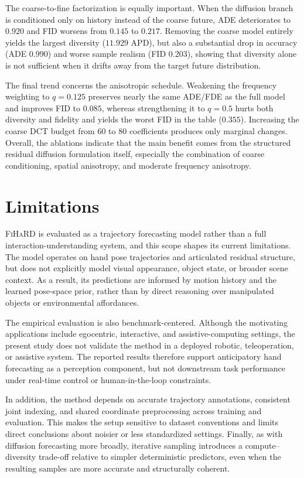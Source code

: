 \documentclass[runningheads]{llncs}
\newcommand{\modelname}{\textsc{FiHaRD}}
\begin{document}
The coarse-to-fine factorization is equally important. When the diffusion branch is conditioned only on history instead of the coarse future, ADE deteriorates to $0.920$ and FID worsens from $0.145$ to $0.217$. Removing the coarse model entirely yields the largest diversity ($11.929$ APD), but also a substantial drop in accuracy (ADE $0.990$) and worse sample realism (FID $0.203$), showing that diversity alone is not sufficient when it drifts away from the target future distribution.

The final trend concerns the anisotropic schedule. Weakening the frequency weighting to $q=0.125$ preserves nearly the same ADE/FDE as the full model and improves FID to $0.085$, whereas strengthening it to $q=0.5$ hurts both diversity and fidelity and yields the worst FID in the table ($0.355$). Increasing the coarse DCT budget from $60$ to $80$ coefficients produces only marginal changes. Overall, the ablations indicate that the main benefit comes from the structured residual diffusion formulation itself, especially the combination of coarse conditioning, spatial anisotropy, and moderate frequency anisotropy.

\section{Limitations}

\modelname{} is evaluated as a trajectory forecasting model rather than a full interaction-understanding system, and this scope shapes its current limitations. The model operates on hand pose trajectories and articulated residual structure, but does not explicitly model visual appearance, object state, or broader scene context. As a result, its predictions are informed by motion history and the learned pose-space prior, rather than by direct reasoning over manipulated objects or environmental affordances.

The empirical evaluation is also benchmark-centered. Although the motivating applications include egocentric, interactive, and assistive-computing settings, the present study does not validate the method in a deployed robotic, teleoperation, or assistive system. The reported results therefore support anticipatory hand forecasting as a perception component, but not downstream task performance under real-time control or human-in-the-loop constraints.

In addition, the method depends on accurate trajectory annotations, consistent joint indexing, and shared coordinate preprocessing across training and evaluation. This makes the setup sensitive to dataset conventions and limits direct conclusions about noisier or less standardized settings. Finally, as with diffusion forecasting more broadly, iterative sampling introduces a compute--diversity trade-off relative to simpler deterministic predictors, even when the resulting samples are more accurate and structurally coherent.
\end{document}
